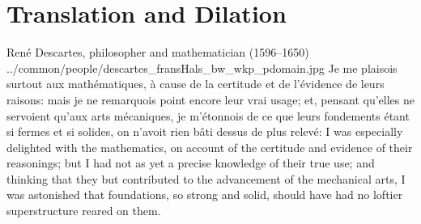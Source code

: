﻿%

\chapter{Translation and Dilation}
\qboxnpqt
  {Ren\'e Descartes, philosopher and mathematician (1596--1650)
   \footnotemark}
  {../common/people/descartes_fransHals_bw_wkp_pdomain.jpg}
  {Je me plaisois surtout aux math\'ematiques,
    \`a cause de la certitude et de l'\'evidence de leurs raisons:
    mais je ne remarquois point encore leur vrai usage;
    et, pensant qu'elles ne servoient qu'aux arts m\'ecaniques,
    je m'\'etonnois de ce que leurs fondements \'etant si fermes et si solides,
    on n'avoit rien b\^ati dessus de plus relev\'e:}
  {I was especially delighted with the mathematics,
    on account of the certitude and evidence of their reasonings;
    but I had not as yet a precise knowledge of their true use;
    and thinking that they but contributed to the advancement of the mechanical arts,
    I was astonished that foundations, so strong and solid,
    should have had no loftier superstructure reared on them.}

